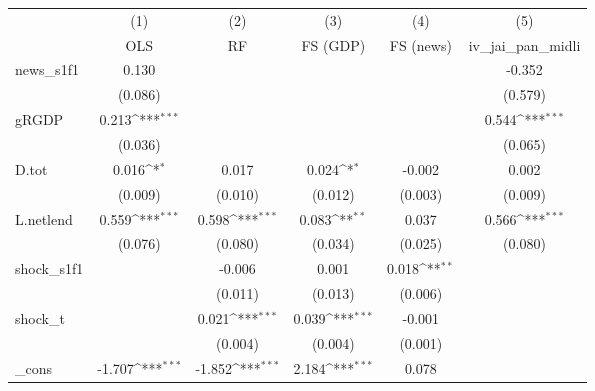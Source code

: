 {
\def\sym#1{\ifmmode^{#1}\else\(^{#1}\)\fi}
\begin{tabular}{l*{5}{c}}
\toprule
            &\multicolumn{1}{c}{(1)}&\multicolumn{1}{c}{(2)}&\multicolumn{1}{c}{(3)}&\multicolumn{1}{c}{(4)}&\multicolumn{1}{c}{(5)}\\
            &\multicolumn{1}{c}{OLS}&\multicolumn{1}{c}{RF}&\multicolumn{1}{c}{FS (GDP)}&\multicolumn{1}{c}{FS (news)}&\multicolumn{1}{c}{iv\_jai\_pan\_midli}\\
\midrule
news\_s1f1   &       0.130         &                     &                     &                     &      -0.352         \\
            &     (0.086)         &                     &                     &                     &     (0.579)         \\
\addlinespace
gRGDP       &       0.213\sym{***}&                     &                     &                     &       0.544\sym{***}\\
            &     (0.036)         &                     &                     &                     &     (0.065)         \\
\addlinespace
D.tot       &       0.016\sym{*}  &       0.017         &       0.024\sym{*}  &      -0.002         &       0.002         \\
            &     (0.009)         &     (0.010)         &     (0.012)         &     (0.003)         &     (0.009)         \\
\addlinespace
L.netlend   &       0.559\sym{***}&       0.598\sym{***}&       0.083\sym{**} &       0.037         &       0.566\sym{***}\\
            &     (0.076)         &     (0.080)         &     (0.034)         &     (0.025)         &     (0.080)         \\
\addlinespace
shock\_s1f1  &                     &      -0.006         &       0.001         &       0.018\sym{**} &                     \\
            &                     &     (0.011)         &     (0.013)         &     (0.006)         &                     \\
\addlinespace
shock\_t     &                     &       0.021\sym{***}&       0.039\sym{***}&      -0.001         &                     \\
            &                     &     (0.004)         &     (0.004)         &     (0.001)         &                     \\
\addlinespace
\_cons      &      -1.707\sym{***}&      -1.852\sym{***}&       2.184\sym{***}&       0.078         &                     \\

\end{tabular}}
